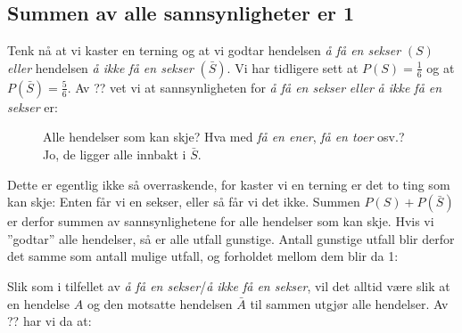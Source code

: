 \subsection{Summen av alle sannsynligheter er 1}
Tenk nå at vi kaster en terning og at vi godtar hendelsen \textit{å få en sekser} $ (S) $ \textsl{eller} hendelsen \textit{å ikke få en sekser} $ (\bar{S}) $. Vi har tidligere sett at $ {P(S)=\frac{1}{6}} $ og at $ {P(\bar{S})=\frac{5}{6} }$. Av ?? vet vi at sannsynligheten for \textit{å få en sekser} \textsl{eller} \textit{å ikke få en sekser} er:
\begin{figure}
	\vs\vs
	\begin{shaded}
		Alle hendelser som kan skje? Hva med \textit{få en ener}, \textit{få en toer} osv.? Jo, de ligger alle innbakt i $ \bar{S} $.
	\end{shaded}
\end{figure}
Dette er egentlig ikke så overraskende, for kaster vi en terning er det to ting som kan skje: Enten får vi en sekser, eller så får vi det ikke. Summen $ P(S)+P(\bar{S}) $ er derfor summen av sannsynlighetene for alle hendelser som kan skje. Hvis vi ''godtar'' alle hendelser, så er alle utfall gunstige. Antall gunstige utfall blir derfor det samme som antall mulige utfall, og forholdet mellom dem blir da 1: 

Slik som i tilfellet av \textit{å få en sekser}/\textit{å ikke få en sekser}, vil det alltid være slik at en hendelse $ A $ og den motsatte hendelsen $ \bar A $ til sammen utgjør alle hendelser. Av ?? har vi da at:
